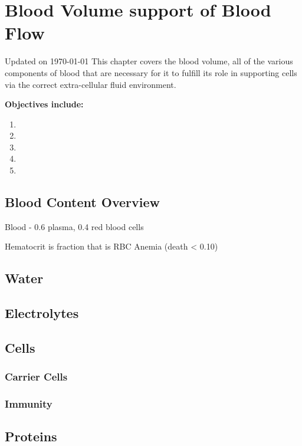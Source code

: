 \chapter{Blood Volume support of Blood Flow}\label{chp:blood_content}
Updated on \today
\minitoc
This chapter covers the blood volume, all of the various components of blood that are necessary for it to fulfill its role in supporting cells via the correct extra-cellular fluid environment.

\vspace{5mm}

\textbf{Objectives include:}
\begin{enumerate}
    \item
    \item
    \item
    \item
    \item
\end{enumerate}

\section{Blood Content Overview}

Blood - 0.6 plasma, 0.4 red blood cells 

Hematocrit is fraction that is RBC
Anemia (death < 0.10)

\section{Water}

\section{Electrolytes}

\section{Cells}
\subsection{Carrier Cells}
\subsection{Immunity}

\section{Proteins}

